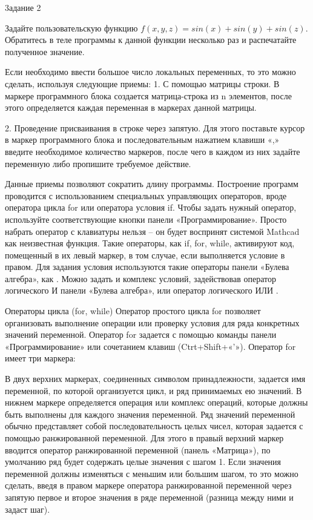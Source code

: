 3адание 2

Задайте пользовательскую функцию $f(x,y,z) = sin(x)+sin(y)+sin(z)$. Обратитесь в теле программы к данной функции несколько раз и распечатайте полученное значение.



Если необходимо ввести большое число локальных переменных, то это можно сделать, используя следующие приемы:
1. С помощью матрицы строки. В маркере программного блока создается матрица-строка из n элементов, после этого определяется каждая переменная в маркерах данной матрицы.



2. Проведение присваивания в строке через запятую. Для этого поставьте курсор в маркер программного блока и последовательным нажатием клавиши «,» введите необходимое количество маркеров, после чего в каждом из них задайте переменную либо пропишите требуемое действие.



Данные приемы позволяют сократить длину программы.
Построение программ проводится с использованием специальных управляющих операторов, вроде оператора цикла for или оператора условия if. Чтобы задать нужный оператор, используйте соответствующие кнопки панели «Программирование». Просто набрать оператор с клавиатуры нельзя – он будет воспринят системой Mathcad как неизвестная функция.
Такие операторы, как if, for, while, активируют код, помещенный в их левый маркер, в том случае, если выполняется условие в правом. Для задания условия используются такие операторы панели «Булева алгебра», как . Можно задать и комплекс условий, задействовав оператор логического И  панели «Булева алгебра», или оператор логического ИЛИ .

Операторы цикла (for, while)
Оператор простого цикла for позволяет организовать выполнение операции или проверку условия для ряда конкретных значений переменной. Оператор for задается с помощью команды панели «Программирование» или сочетанием клавиш (Ctrt+Shift+«'»). Оператор for имеет три маркера:



В двух верхних маркерах, соединенных символом принадлежности, задается имя переменной, по которой организуется цикл, и ряд принимаемых ею значений. В нижнем маркере определяется операция или комплекс операций, которые должны быть выполнены для каждого значения переменной. Ряд значений переменной обычно представляет собой последовательность целых чисел, которая задается с помощью ранжированной переменной. Для этого в правый верхний маркер вводится оператор ранжированной переменной (панель «Матрица»), по умолчанию ряд будет содержать целые значения с шагом 1. Если значения переменной должны изменяться с меньшим или большим шагом, то это можно сделать, введя в правом маркере оператора ранжированной переменной через запятую первое и второе значения в ряде переменной (разница между ними и задаст шаг).



